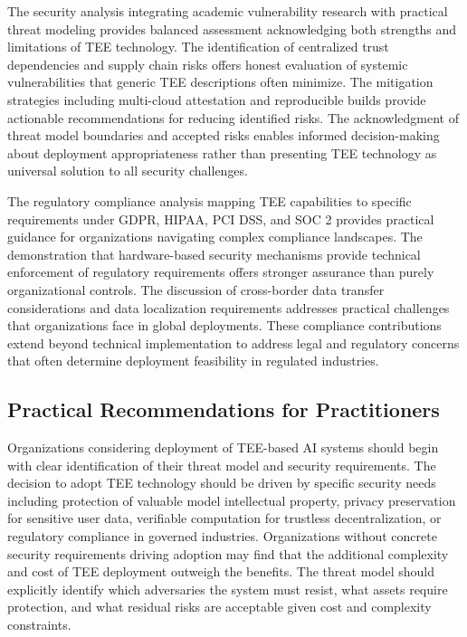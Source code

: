 The security analysis integrating academic vulnerability research with practical threat modeling provides balanced assessment acknowledging both strengths and limitations of TEE technology. The identification of centralized trust dependencies and supply chain risks offers honest evaluation of systemic vulnerabilities that generic TEE descriptions often minimize. The mitigation strategies including multi-cloud attestation and reproducible builds provide actionable recommendations for reducing identified risks. The acknowledgment of threat model boundaries and accepted risks enables informed decision-making about deployment appropriateness rather than presenting TEE technology as universal solution to all security challenges.

The regulatory compliance analysis mapping TEE capabilities to specific requirements under GDPR, HIPAA, PCI DSS, and SOC 2 provides practical guidance for organizations navigating complex compliance landscapes. The demonstration that hardware-based security mechanisms provide technical enforcement of regulatory requirements offers stronger assurance than purely organizational controls. The discussion of cross-border data transfer considerations and data localization requirements addresses practical challenges that organizations face in global deployments. These compliance contributions extend beyond technical implementation to address legal and regulatory concerns that often determine deployment feasibility in regulated industries.

\subsection{Practical Recommendations for Practitioners}

Organizations considering deployment of TEE-based AI systems should begin with clear identification of their threat model and security requirements. The decision to adopt TEE technology should be driven by specific security needs including protection of valuable model intellectual property, privacy preservation for sensitive user data, verifiable computation for trustless decentralization, or regulatory compliance in governed industries. Organizations without concrete security requirements driving adoption may find that the additional complexity and cost of TEE deployment outweigh the benefits. The threat model should explicitly identify which adversaries the system must resist, what assets require protection, and what residual risks are acceptable given cost and complexity constraints.

